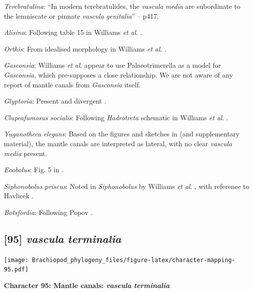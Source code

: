 \documentclass[]{book}
\theoremstyle{definition}
\theoremstyle{definition}
\theoremstyle{definition}
\theoremstyle{remark}
\begin{document}
\emph{Terebratulina}: ``In modern terebratulides, the \emph{vascula}
\emph{media} are subordinate to the lemniscate or pinnate \emph{vascula}
\emph{genitalia}'' -- \citet{Williams1997BrachiopodaRevised} p417.

\emph{Alisina}: Following table 15 in Williams \emph{et al}.
\citeyearpar{Williams2000BrachiopodaLinguliformea}.

\emph{Orthis}: From idealised morphology in Williams \emph{et al}.
\citeyearpar{Williams2000BrachiopodaLinguliformea}.

\emph{Gasconsia}: Williams \emph{et al}. \citeyearpar[table
15]{Williams2000BrachiopodaLinguliformea} appear to use Palaeotrimerella
\citep[as drawn in][]{Williams1997BrachiopodaRevised} as a model for
\emph{Gasconsia}, which pre-supposes a close relationship. We are not
aware of any report of mantle canals from \emph{Gasconsia} itself.

\emph{Glyptoria}: Present and divergent
\citep{Williams2000BrachiopodaLinguliformea}.

\emph{Clupeafumosus socialis}: Following \emph{Hadrotreta} schematic in
Williams \emph{et al}.
\citeyearpar{Williams2000BrachiopodaLinguliformea}.

\emph{Yuganotheca elegans}: Based on the figures and sketches in
\citet{Zhang2014Anearly} (and supplementary material), the mantle canals
are interpreted as lateral, with no clear \emph{vascula} \emph{media}
present.

\emph{Eoobolus}: Fig. 5 in \citet{Balthasar2009Thebrachiopod}.

\emph{Siphonobolus priscus}: Noted in \emph{Siphonobolus} by Williams
\emph{et al}. \citeyearpar{Williams2000BrachiopodaLinguliformea}, with
reference to Havlicek \citeyearpar{Havlicek1982LingulaceaPaterinacea}.

\emph{Botsfordia}: Following Popov \citeyearpar[fig.
2]{Popov1992TheCambrian}.

\hypertarget{vascula-terminalia}{%
\subsection*{\texorpdfstring{{[}95{]} \emph{vascula}
\emph{terminalia}}{{[}95{]} vascula terminalia}}\label{vascula-terminalia}}

\texttt{[image: Brachiopod\_phylogeny\_files/figure-latex/character-mapping-95.pdf]}

\textbf{Character 95: Mantle canals: \emph{vascula} \emph{terminalia}}
\end{document}
